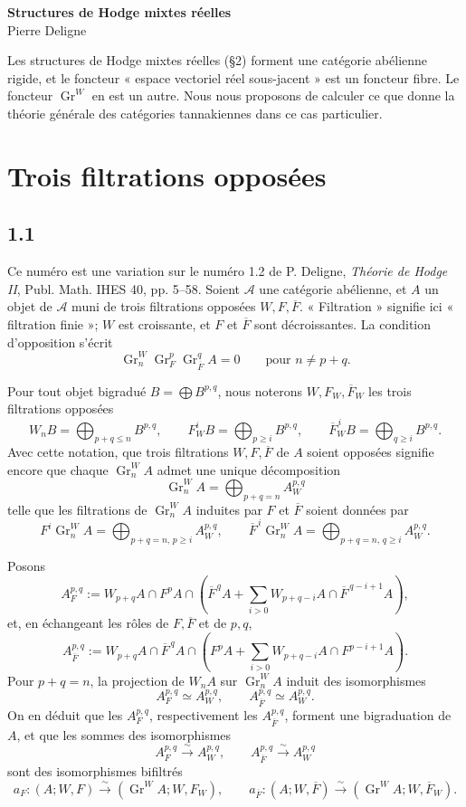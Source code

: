 \documentclass[11pt]{article}
\newcommand{\Gr}{\operatorname{Gr}}
\begin{document}
\begin{center}
 {\Large\bfseries Structures de Hodge mixtes réelles}\\[0.7em]
 {\large Pierre Deligne}
\end{center}

Les structures de Hodge mixtes réelles (§2) forment une catégorie abélienne rigide, et le foncteur « espace vectoriel réel sous-jacent » est un foncteur fibre. Le foncteur \(\Gr^W\) en est un autre. Nous nous proposons de calculer ce que donne la théorie générale des catégories tannakiennes dans ce cas particulier.

\section{Trois filtrations opposées}

\subsection*{1.1}
Ce numéro est une variation sur le numéro 1.2 de P. Deligne, \emph{Théorie de Hodge II}, Publ. Math. IHES 40, pp. 5--58. Soient \(\mathcal A\) une catégorie abélienne, et \(A\) un objet de \(\mathcal A\) muni de trois filtrations opposées \(W,F,\overline F\). « Filtration » signifie ici « filtration finie »; \(W\) est croissante, et \(F\) et \(\overline F\) sont décroissantes. La condition d'opposition s'écrit
\[
   \Gr^W_n\Gr^p_F\Gr^q_{\overline F} A=0
   \qquad\text{pour } n\ne p+q .
\]

Pour tout objet bigradué \(B=\bigoplus B^{p,q}\), nous noterons \(W,F_W,\overline F_W\) les trois filtrations opposées
\[
 W_nB=\bigoplus_{p+q\le n}B^{p,q},\qquad
 F_W^iB=\bigoplus_{p\ge i}B^{p,q},\qquad
 \overline F_W^{\,i}B=\bigoplus_{q\ge i}B^{p,q}.
\]
Avec cette notation, que trois filtrations \(W,F,\overline F\) de \(A\) soient opposées signifie encore que chaque \(\Gr^W_nA\) admet une unique décomposition
\[
   \Gr^W_nA=\bigoplus_{p+q=n} A_W^{p,q}
\]
telle que les filtrations de \(\Gr^W_nA\) induites par \(F\) et \(\overline F\) soient données par
\[
 F^i\Gr^W_nA=\bigoplus_{p+q=n,\,p\ge i}A_W^{p,q},\qquad
 \overline F^{\,i}\Gr^W_nA=\bigoplus_{p+q=n,\,q\ge i}A_W^{p,q}.
\]

Posons
\[
 A_F^{p,q}:=W_{p+q}A\cap F^pA\cap
 \left(\overline F^{\,q}A+\sum_{i>0}W_{p+q-i}A\cap \overline F^{\,q-i+1}A\right),
\]
et, en échangeant les rôles de \(F,\overline F\) et de \(p,q\),
\[
 A_{\overline F}^{p,q}:=W_{p+q}A\cap \overline F^{\,q}A\cap
 \left(F^pA+\sum_{i>0}W_{p+q-i}A\cap F^{p-i+1}A\right).
\]
Pour \(p+q=n\), la projection de \(W_nA\) sur \(\Gr^W_nA\) induit des isomorphismes
\[
 A_F^{p,q}\simeq A_W^{p,q},\qquad
 A_{\overline F}^{p,q}\simeq A_W^{p,q}.
\]
On en déduit que les \(A_F^{p,q}\), respectivement les \(A_{\overline F}^{p,q}\), forment une bigraduation de \(A\), et que les sommes des isomorphismes
\[
 A_F^{p,q}\xrightarrow{\sim}A_W^{p,q},\qquad
 A_{\overline F}^{p,q}\xrightarrow{\sim}A_W^{p,q}
\]
sont des isomorphismes bifiltrés
\[
 a_F:(A;W,F)\xrightarrow{\sim}(\Gr^WA;W,F_W),
 \qquad
 a_{\overline F}:(A;W,\overline F)\xrightarrow{\sim}(\Gr^WA;W,\overline F_W).
\]
\end{document}
